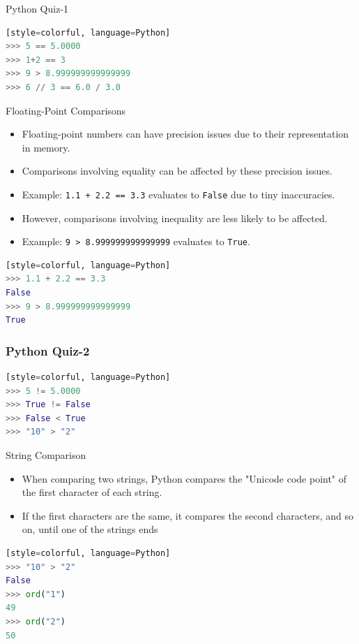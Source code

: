 \documentclass{beamer}
\begin{document}
\begin{frame}[fragile]{Python Quiz-1}
\begin{lstlisting}[style=colorful, language=Python][style=colorful, language=Python]
>>> 5 == 5.0000
>>> 1+2 == 3 
>>> 9 > 8.999999999999999
>>> 6 // 3 == 6.0 / 3.0
\end{lstlisting}
\end{frame}

\begin{frame}[fragile]{Floating-Point Comparisons}
    \begin{itemize}
        \item Floating-point numbers can have precision issues due to their representation in memory.
        \item Comparisons involving equality can be affected by these precision issues.
        \item Example: \texttt{1.1 + 2.2 == 3.3} evaluates to \texttt{False} due to tiny inaccuracies.
        \item However, comparisons involving inequality are less likely to be affected.
        \item Example: \texttt{9 > 8.999999999999999} evaluates to \texttt{True}.
    \end{itemize}
    \begin{lstlisting}[style=colorful, language=Python][style=colorful, language=Python]
>>> 1.1 + 2.2 == 3.3
False
>>> 9 > 8.999999999999999
True
    \end{lstlisting}
\end{frame}

\begin{frame}[fragile]
    \frametitle{Python Quiz-2}
    \begin{lstlisting}[style=colorful, language=Python][style=colorful, language=Python]
>>> 5 != 5.0000
>>> True != False
>>> False < True
>>> "10" > "2"
    \end{lstlisting}
\end{frame}

\begin{frame}[fragile]{String Comparison}
    \begin{itemize}
        \item When comparing two strings, Python compares the "Unicode code point" of the first character of each string.
        \item If the first characters are the same, it compares the second characters, and so on, until one of the strings ends
    \end{itemize}
\pause
    \begin{lstlisting}[style=colorful, language=Python][style=colorful, language=Python]
>>> "10" > "2"
False
>>> ord("1")
49
>>> ord("2")
50
    \end{lstlisting}
\end{frame}
\end{document}
